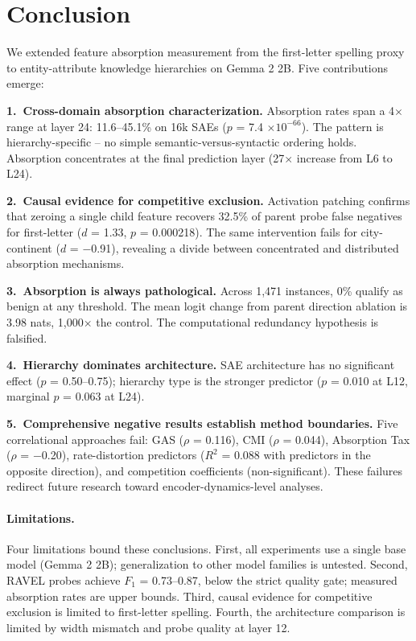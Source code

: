 \documentclass{article}
\begin{document}
\section{Conclusion}
\label{sec:conclusion}

We extended feature absorption measurement from the first-letter spelling proxy to entity-attribute knowledge hierarchies on Gemma 2 2B. Five contributions emerge:

\textbf{1.\ Cross-domain absorption characterization.} Absorption rates span a 4$\times$ range at layer 24: 11.6--45.1\% on 16k SAEs ($p$ = 7.4 $\times 10^{-66}$). The pattern is hierarchy-specific -- no simple semantic-versus-syntactic ordering holds. Absorption concentrates at the final prediction layer (27$\times$ increase from L6 to L24).

\textbf{2.\ Causal evidence for competitive exclusion.} Activation patching confirms that zeroing a single child feature recovers 32.5\% of parent probe false negatives for first-letter ($d$ = 1.33, $p$ = 0.000218). The same intervention fails for city-continent ($d$ = $-$0.91), revealing a divide between concentrated and distributed absorption mechanisms.

\textbf{3.\ Absorption is always pathological.} Across 1{,}471 instances, 0\% qualify as benign at any threshold. The mean logit change from parent direction ablation is 3.98 nats, 1{,}000$\times$ the control. The computational redundancy hypothesis is falsified.

\textbf{4.\ Hierarchy dominates architecture.} SAE architecture has no significant effect ($p$ = 0.50--0.75); hierarchy type is the stronger predictor ($p$ = 0.010 at L12, marginal $p$ = 0.063 at L24).

\textbf{5.\ Comprehensive negative results establish method boundaries.} Five correlational approaches fail: GAS ($\rho$ = 0.116), CMI ($\rho$ = 0.044), Absorption Tax ($\rho$ = $-$0.20), rate-distortion predictors ($R^2$ = 0.088 with predictors in the opposite direction), and competition coefficients (non-significant). These failures redirect future research toward encoder-dynamics-level analyses.

\paragraph{Limitations.} Four limitations bound these conclusions. First, all experiments use a single base model (Gemma 2 2B); generalization to other model families is untested. Second, RAVEL probes achieve $F_1$ = 0.73--0.87, below the strict quality gate; measured absorption rates are upper bounds. Third, causal evidence for competitive exclusion is limited to first-letter spelling. Fourth, the architecture comparison is limited by width mismatch and probe quality at layer 12.
\end{document}
